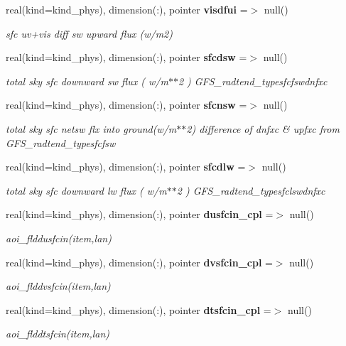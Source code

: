\begin{DoxyCompactItemize}
real(kind=kind\+\_\+phys), dimension(\+:), pointer \textbf{ visdfui} =$>$ null()
\begin{DoxyCompactList}\small\item\em sfc uv+vis diff sw upward flux (w/m2) \end{DoxyCompactList}\item 
real(kind=kind\+\_\+phys), dimension(\+:), pointer \textbf{ sfcdsw} =$>$ null()
\begin{DoxyCompactList}\small\item\em total sky sfc downward sw flux ( w/m$\ast$$\ast$2 ) G\+F\+S\+\_\+radtend\+\_\+typesfcfswdnfxc \end{DoxyCompactList}\item 
real(kind=kind\+\_\+phys), dimension(\+:), pointer \textbf{ sfcnsw} =$>$ null()
\begin{DoxyCompactList}\small\item\em total sky sfc netsw flx into ground(w/m$\ast$$\ast$2) difference of dnfxc \& upfxc from G\+F\+S\+\_\+radtend\+\_\+typesfcfsw \end{DoxyCompactList}\item 
real(kind=kind\+\_\+phys), dimension(\+:), pointer \textbf{ sfcdlw} =$>$ null()
\begin{DoxyCompactList}\small\item\em total sky sfc downward lw flux ( w/m$\ast$$\ast$2 ) G\+F\+S\+\_\+radtend\+\_\+typesfclswdnfxc \end{DoxyCompactList}\item 
real(kind=kind\+\_\+phys), dimension(\+:), pointer \textbf{ dusfcin\+\_\+cpl} =$>$ null()
\begin{DoxyCompactList}\small\item\em aoi\+\_\+flddusfcin(item,lan) \end{DoxyCompactList}\item 
real(kind=kind\+\_\+phys), dimension(\+:), pointer \textbf{ dvsfcin\+\_\+cpl} =$>$ null()
\begin{DoxyCompactList}\small\item\em aoi\+\_\+flddvsfcin(item,lan) \end{DoxyCompactList}\item 
real(kind=kind\+\_\+phys), dimension(\+:), pointer \textbf{ dtsfcin\+\_\+cpl} =$>$ null()
\begin{DoxyCompactList}\small\item\em aoi\+\_\+flddtsfcin(item,lan) \end{DoxyCompactList}\item 

\end{DoxyCompactItemize}
